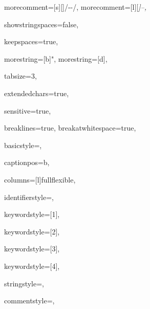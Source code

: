 {%
morecomment=[s][\color{commentcolor}]{/-}{-/},
morecomment=[l][\itshape \color{commentcolor}]{--},

showstringspaces=false,

keepspaces=true,

morestring=[b]",
morestring=[d],

tabsize=3,

extendedchars=true,

sensitive=true,

breaklines=true,
breakatwhitespace=true,

basicstyle=\ttfamily\small,

captionpos=b,

columns=[l]fullflexible,


identifierstyle={\ttfamily\color{black}},

keywordstyle=[1]{\ttfamily\color{keywordcolor}},

keywordstyle=[2]{\ttfamily\color{sortcolor}},

keywordstyle=[3]{\ttfamily\color{tacticcolor}},

keywordstyle=[4]{\ttfamily\color{attributecolor}},

stringstyle=\ttfamily,

commentstyle={\ttfamily\footnotesize },

}